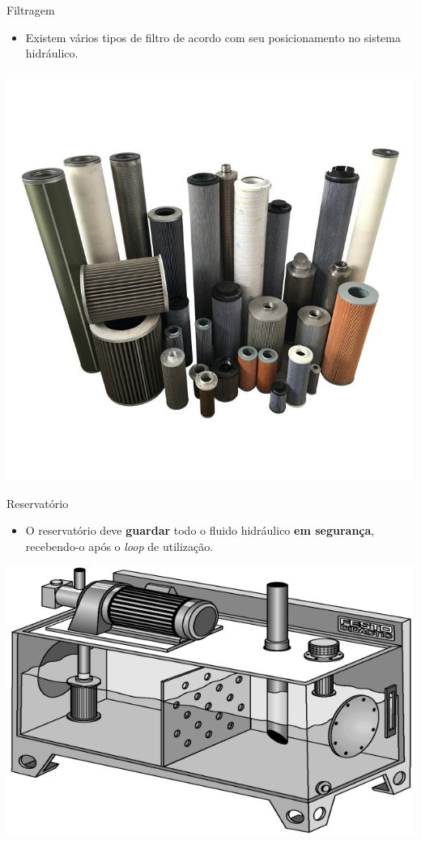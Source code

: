 \begin{frame}{Filtragem}
	\begin{block}{}
		\begin{itemize}
			\item Existem vários tipos de filtro de acordo com seu posicionamento no sistema hidráulico.
		\end{itemize}
	\end{block}

	\centering
	\includegraphics[width=0.6\linewidth]{Figuras/Ch15/fig16}

\end{frame}


\begin{frame}{Reservatório}
	\begin{block}{}
		\begin{itemize}
			\item O reservatório deve \textbf{guardar} todo o fluido hidráulico \textbf{em segurança}, recebendo-o após o \textit{loop} de utilização.
		\end{itemize}
	\end{block}

	\medskip
	
	\centering
	\includegraphics[width=0.6\linewidth]{Figuras/Ch15/fig17}
	
\end{frame}


